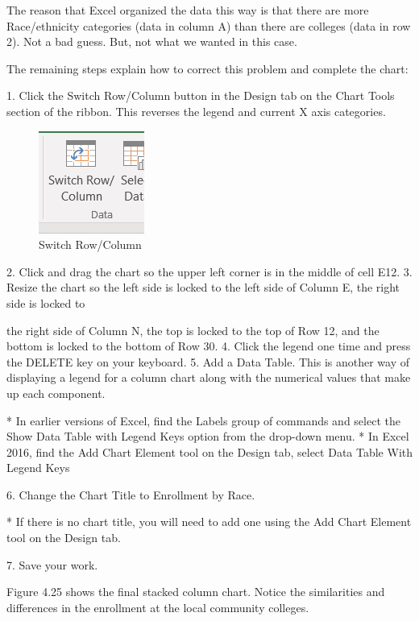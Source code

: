 The reason that Excel organized the data this way is that there are more Race/ethnicity categories
(data in column A) than there are colleges (data in row 2). Not a bad guess. But, not what we wanted
in this case.

The remaining steps explain how to correct this problem and complete the chart:

1. Click the Switch Row/Column button in the Design tab on the Chart Tools section of the
ribbon. This reverses the legend and current X axis categories.


\begin{figure}[H]
	\centering
	\includegraphics[width=\maxwidth{.95\linewidth}]{gfx/ch04_fig27}
	\caption{Switch Row/Column}
	\label{04:fig27}
\end{figure}





2. Click and drag the chart so the upper left corner is in the middle of cell E12.
3. Resize the chart so the left side is locked to the left side of Column E, the right side is locked to



the right side of Column N, the top is locked to the top of Row 12, and the bottom is locked to
the bottom of Row 30.
4. Click the legend one time and press the DELETE key on your keyboard.
5. Add a Data Table. This is another way of displaying a legend for a column chart along with the
numerical values that make up each component.

* In earlier versions of Excel, find the Labels group of commands and select the Show Data
Table with Legend Keys option from the drop-down menu.
* In Excel 2016, find the Add Chart Element tool on the Design tab, select Data Table With
Legend Keys

6. Change the Chart Title to Enrollment by Race.

* If there is no chart title, you will need to add one using the Add Chart Element tool on
the Design tab.

7. Save your work.

Figure 4.25 shows the final stacked column chart. Notice the similarities and differences in the
enrollment at the local community colleges.


